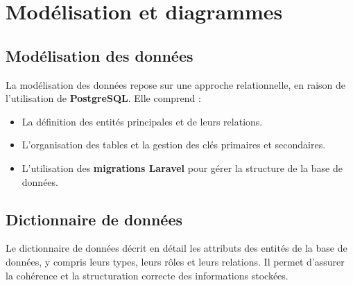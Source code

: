 \section{Modélisation et diagrammes}

\subsection{Modélisation des données}
La modélisation des données repose sur une approche relationnelle, en raison de l'utilisation de \textbf{PostgreSQL}. Elle comprend :
\begin{itemize}
    \item La définition des entités principales et de leurs relations.
    \item L'organisation des tables et la gestion des clés primaires et secondaires.
    \item L'utilisation des \textbf{migrations Laravel} pour gérer la structure de la base de données.
\end{itemize}

\subsection{Dictionnaire de données}
Le dictionnaire de données décrit en détail les attributs des entités de la base de données, y compris leurs types, leurs rôles et leurs relations. Il permet d'assurer la cohérence et la structuration correcte des informations stockées.

\renewcommand{\arraystretch}{1.3} %

